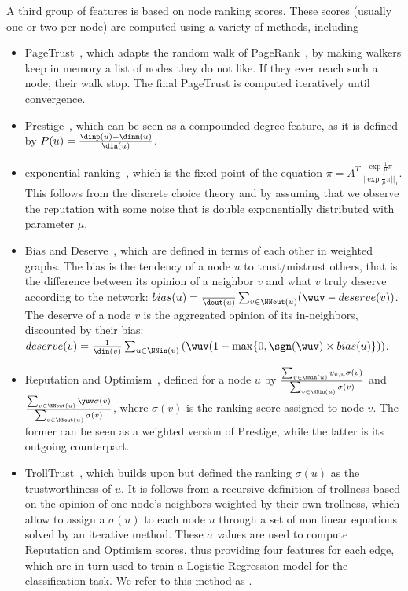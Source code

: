 A third group of features is based on node ranking scores. These scores (usually one or two per
node) are computed using a variety of methods, including
\begin{itemize}
	\item	PageTrust~\autocite{de2008pagetrust}, which adapts the random walk of
		PageRank~\autocite{pagerank99}, by making walkers keep in memory a list of nodes they do not
		like. If they ever reach such a node, their walk stop. The final PageTrust is computed
		iteratively until convergence. 
	\item Prestige~\autocite{zolfaghar2010mining}, which can be seen as a compounded degree feature,
		as it is defined by $P(u) = \frac{\dinp(u)-\dinm(u)}{\din(u)}$.
	\item	exponential ranking~\autocite{traag2010exponential}, which is the fixed point of the
		equation $\pi = A^T\frac{\exp{\frac{1}{\mu}\pi}}{||\exp{\frac{1}{\mu}\pi}||_1}$. This follows
		from the discrete choice theory and by assuming that we observe the reputation with some noise
		that is double exponentially distributed with parameter $\mu$.
	\item	Bias and Deserve~\autocite{mishra2011finding}, which are defined in terms of each other in
		weighted graphs. The bias is the tendency of a node $u$ to trust/mistrust others, that is the
		difference between its opinion of a neighbor $v$ and what $v$ truly deserve according to the
		network: $bias(u) = \frac{1}{\dout(u)}\sum_{v\in\NNout(u)}(\wuv - deserve(v))$. The deserve of a
		node $v$ is the aggregated opinion of its in-neighbors, discounted by their bias: $deserve(v) =
		\frac{1}{\din(v)}\sum_{u\in\NNin(v)}\left(\wuv(1-\max\{0, \sgn(\wuv)\times bias(u)\})\right)$.
	\item	Reputation and Optimism~\autocite{shahriari2014ranking}, defined for a node $u$ by
		$\frac{\sum_{v \in \NNin(u)} y_{v,u}\sigma(v)}{\sum_{v \in \NNin(u)} \sigma(v)}$ and $
		\frac{\sum_{v \in \NNout(u)} \yuv\sigma(v)}{\sum_{v \in \NNout(u)} \sigma(v)}$, where
		$\sigma(v)$ is the ranking score assigned to node $v$. The former can be seen as a weighted
		version of Prestige, while the latter is its outgoing counterpart.
	\item	TrollTrust~\autocite{wu2016troll}, which builds upon \autocite{shahriari2014ranking} but
		defined the ranking $\sigma(u)$ as the trustworthiness of $u$. It is follows from a recursive
		definition of trollness based on the opinion of one node's neighbors weighted by their own
		trollness, which allow to assign a $\sigma(u)$ to each node $u$ through a set of non linear
		equations solved by an iterative method. These $\sigma$ values are used to compute Reputation
		and Optimism scores, thus providing four features for each edge, which are in turn used to train
		a Logistic Regression model for the classification task. We refer to this method as
		\emph{\compranknodes{}}.
\end{itemize}

